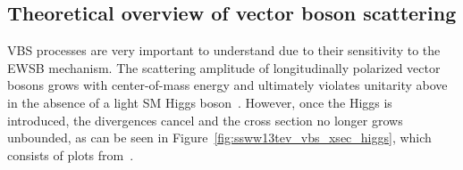 \subsection{Theoretical overview of vector boson scattering}\label{ssww13tev:vbs_theory}
VBS processes are very important to understand due to their sensitivity to the EWSB mechanism.
The scattering amplitude of longitudinally polarized vector bosons grows with center-of-mass energy and ultimately violates unitarity above  in the absence of a light SM Higgs boson~\cite{1977.ben-lee-weak-interactions, 2009.strong-gauge-boson-scattering}.
However, once the Higgs is introduced, the divergences cancel and the cross section no longer grows unbounded, as can be seen in Figure~\ref{fig:ssww13tev_vbs_xsec_higgs}, which consists of plots from~\cite{2008.vbs-resonances-unitarity}.

